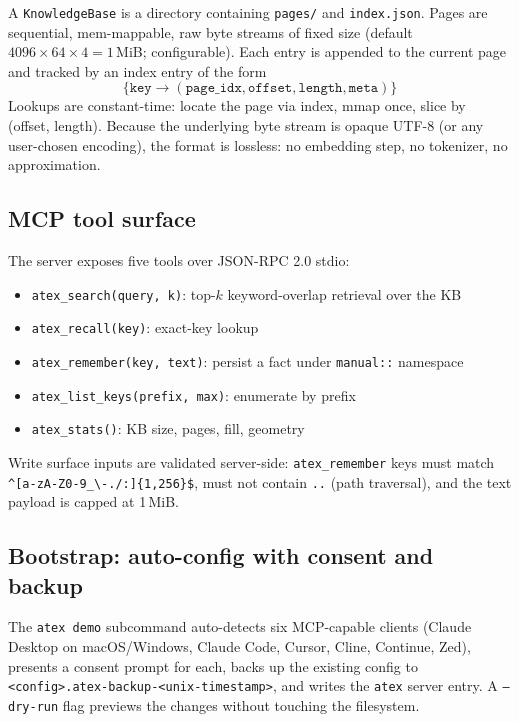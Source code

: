 \documentclass[10pt,letterpaper]{article}
\begin{document}
A \texttt{KnowledgeBase} is a directory containing \texttt{pages/} and \texttt{index.json}. Pages are sequential, mem-mappable, raw byte streams of fixed size (default $4096 \times 64 \times 4 = 1$\,MiB; configurable). Each entry is appended to the current page and tracked by an index entry of the form
\[
\{ \texttt{key} \to (\texttt{page\_idx}, \texttt{offset}, \texttt{length}, \texttt{meta}) \}
\]
Lookups are constant-time: locate the page via index, mmap once, slice by (offset, length). Because the underlying byte stream is opaque UTF-8 (or any user-chosen encoding), the format is lossless: no embedding step, no tokenizer, no approximation.

\subsection{MCP tool surface}

The server exposes five tools over JSON-RPC 2.0 stdio:

\begin{itemize}[leftmargin=*]
\item \texttt{atex\_search(query, k)}: top-$k$ keyword-overlap retrieval over the KB
\item \texttt{atex\_recall(key)}: exact-key lookup
\item \texttt{atex\_remember(key, text)}: persist a fact under \texttt{manual::} namespace
\item \texttt{atex\_list\_keys(prefix, max)}: enumerate by prefix
\item \texttt{atex\_stats()}: KB size, pages, fill, geometry
\end{itemize}

Write surface inputs are validated server-side: \texttt{atex\_remember} keys must match \texttt{\textasciicircum [a-zA-Z0-9\_\textbackslash-./:]\{1,256\}\$}, must not contain \texttt{..} (path traversal), and the text payload is capped at 1\,MiB.

\subsection{Bootstrap: auto-config with consent and backup}

The \texttt{atex demo} subcommand auto-detects six MCP-capable clients (Claude Desktop on macOS/Windows, Claude Code, Cursor, Cline, Continue, Zed), presents a consent prompt for each, backs up the existing config to \texttt{<config>.atex-backup-<unix-timestamp>}, and writes the \texttt{atex} server entry. A \texttt{--dry-run} flag previews the changes without touching the filesystem.
\end{document}
